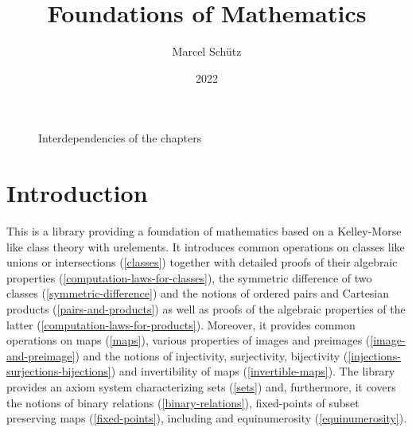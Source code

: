 \documentclass[12pt,oneside]{book}
\title{Foundations of Mathematics}
\author{Marcel Schütz}
\date{2022}
\begin{document}
  \maketitle
  
  \tableofcontents

  \begin{figure}[H]
    \centering
    \caption*{Interdependencies of the chapters}
  \end{figure}


  \section*{Introduction}

  This is a library providing a foundation of mathematics based on a
  Kelley-Morse like class theory with urelements.
  It introduces common operations on classes like unions or intersections
  (\cref{classes}) together with detailed proofs of their algebraic
  properties (\cref{computation-laws-for-classes}), the symmetric
  difference of two classes (\cref{symmetric-difference}) and the notions
  of ordered pairs and Cartesian products (\cref{pairs-and-products}) as well as
  proofs of the algebraic properties of the latter
  (\cref{computation-laws-for-products}).
  Moreover, it provides common operations on maps (\cref{maps}), various
  properties of images and preimages (\cref{image-and-preimage}) and the notions
  of injectivity, surjectivity, bijectivity
  (\cref{injections-surjections-bijections}) and invertibility of maps
  (\cref{invertible-maps}).
  The library provides an axiom system characterizing sets (\cref{sets}) and,
  furthermore, it covers the notions of binary relations
  (\cref{binary-relations}), fixed-points of subset preserving maps
  (\cref{fixed-points}), including and equinumerosity (\cref{equinumerosity}).
  
\end{document}
